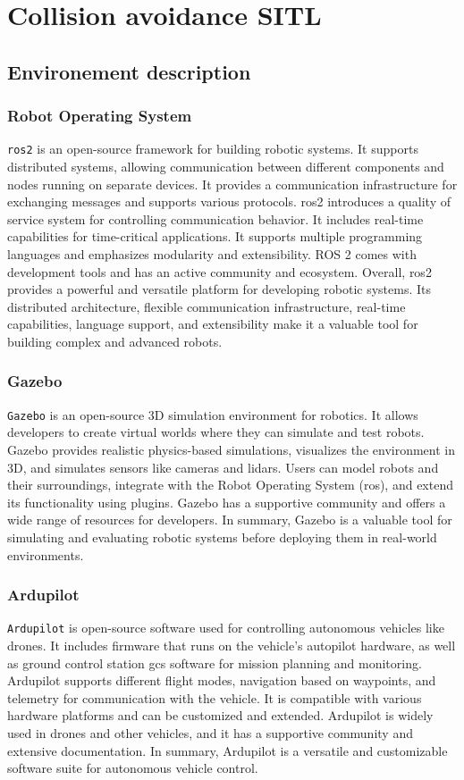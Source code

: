 \section{Collision avoidance SITL}
\subsection{Environement description}
\subsubsection{Robot Operating System}
\texttt{\gls{ros2}} is an open-source framework for building robotic systems. It supports distributed systems, allowing communication between different components and nodes running on separate devices.
It provides a communication infrastructure for exchanging messages and supports various protocols. \gls{ros2} introduces a quality of service system for controlling communication behavior.
It includes real-time capabilities for time-critical applications. It supports multiple programming languages and emphasizes modularity and extensibility. ROS 2 comes with development tools and has an active community and ecosystem.
Overall, \gls{ros2} provides a powerful and versatile platform for developing robotic systems. Its distributed architecture, flexible communication infrastructure, real-time capabilities, language support, and extensibility make it a valuable tool for building complex and advanced robots.
\subsubsection{Gazebo}
\texttt{Gazebo} is an open-source 3D simulation environment for robotics. It allows developers to create virtual worlds where they can simulate and test robots. Gazebo provides realistic physics-based simulations, visualizes the environment in 3D, and simulates sensors like cameras and \gls{lidar}s.
Users can model robots and their surroundings, integrate with the Robot Operating System (\gls{ros}), and extend its functionality using plugins. Gazebo has a supportive community and offers a wide range of resources for developers.
In summary, Gazebo is a valuable tool for simulating and evaluating robotic systems before deploying them in real-world environments.
\subsubsection{Ardupilot}
\texttt{Ardupilot} is open-source software used for controlling autonomous vehicles like drones. It includes firmware that runs on the vehicle's autopilot hardware, as well as ground control station \gls{gcs} software for mission planning and monitoring.
Ardupilot supports different flight modes, navigation based on waypoints, and telemetry for communication with the vehicle. It is compatible with various hardware platforms and can be customized and extended.
Ardupilot is widely used in drones and other vehicles, and it has a supportive community and extensive documentation. In summary, Ardupilot is a versatile and customizable software suite for autonomous vehicle control.

